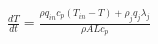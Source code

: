 \documentclass[preview]{standalone}
\begin{document}
\begin{align*}
\frac{dT}{dt} = \frac{\rho q_{in} c_p (T_{in} - T) + \rho_j q_j \lambda_j}{\rho A L c_p}
\end{align*}
\end{document}
